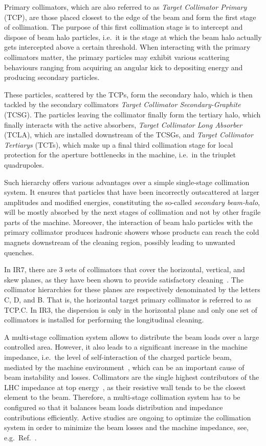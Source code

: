 Primary collimators, which are also referred to as \textit{Target Collimator Primary} (TCP), are those placed closest to the edge of the beam and form the first stage of collimation. The purpose of this first collimation stage is to intercept and dispose of beam halo particles, i.e.\ it is the stage at which the beam halo actually gets intercepted above a certain threshold. When interacting with the primary collimators matter, the primary particles may exhibit various scattering behaviours ranging from acquiring an angular kick to depositing energy and producing secondary particles. 

These particles, scattered by the TCPs, form the secondary halo, which is then tackled by the secondary collimators \textit{Target Collimator Secondary-Graphite} (TCSG). The particles leaving the collimator finally form the tertiary halo, which finally interacts with the active absorbers, \textit{Target Collimator Long Absorber} (TCLA), which are installed downstream of the TCSGs, and \textit{Target Collimator Tertiarys} (TCTs), which make up a final third collimation stage for local protection for the aperture bottlenecks in the machine, i.e.\ in the triuplet quadrupoles.

Such hierarchy offers various advantages over a simple single-stage collimation system. It ensures that particles that have been incorrectly outscattered at larger amplitudes and modified energies, constituting the so-called \textit{secondary beam-halo}, will be mostly absorbed by the next stages of collimation and not by other fragile parts of the machine. Moreover, the interaction of beam halo particles with the primary collimator produces hadronic showers whose products can reach the cold magnets downstream of the cleaning region, possibly leading to unwanted quenches.

In IR7, there are 3 sets of collimators that cover the horizontal, vertical, and skew planes, as they have been shown to provide satisfactory cleaning~\cite{Jeanneret:368725}. The collimator hierarchies for these planes are respectively denominated by the letters C, D, and B. That is, the horizontal target primary collimator is referred to as TCP.C. In IR3, the dispersion is only in the horizontal plane and only one set of collimators is installed for performing the longitudinal cleaning.

A multi-stage collimation system allows to distribute the beam loads over a large controlled area. However, it also leads to a significant increase in the machine impedance, i.e.\ the level of self-interaction of the charged particle beam, mediated by the machine environment~\cite{Wiedemann2007}, which can be an important cause of beam instability and losses. Collimators are the single highest contributors of the LHC impedance at top energy~\cite{Mounet:1451296}, as their resistive wall tends to be the closest element to the beam. Therefore, a multi-stage collimation system has to be configured so that it balances beam loads distribution and impedance contributions efficiently. Active studies are ongoing to optimize the collimation system in order to minimize the beam losses and the machine impedance, see, e.g.\ Ref.~\cite{Antipov:2648423}.

